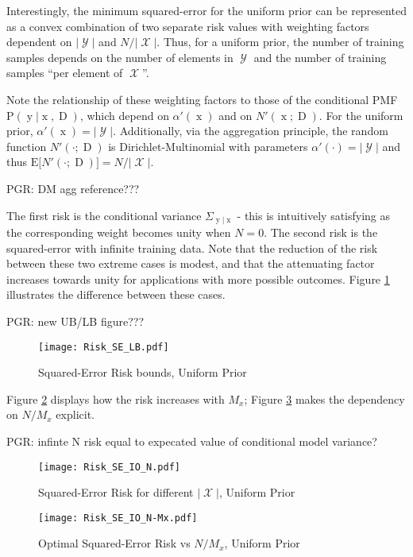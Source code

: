 \documentclass[12pt]{report}
\DeclareMathOperator{\xrm}{\mathrm{x}}
\DeclareMathOperator{\yrm}{\mathrm{y}}
\DeclareMathOperator{\Drm}{\mathrm{D}}
\DeclareMathOperator{\Xcal}{\mathcal{X}}
\DeclareMathOperator{\Ycal}{\mathcal{Y}}
\begin{document}
Interestingly, the minimum squared-error for the uniform prior can be represented as a convex combination of two separate risk values with weighting factors dependent on $|\Ycal|$ and $N/|\Xcal|$. Thus, for a uniform prior, the number of training samples depends  on the number of elements in $\Ycal$ and the number of training samples ``per element of $\Xcal$''.

Note the relationship of these weighting factors to those of the conditional PMF $\text{P}(\yrm | \xrm,\Drm)$, which depend on $\alpha'(\xrm)$ and on $N'(\xrm;\Drm)$. For the uniform prior, $\alpha'(\xrm) = |\Ycal|$. Additionally, via the aggregation principle, the random function $N'(\cdot;\Drm)$ is Dirichlet-Multinomial with parameters $\alpha'(\cdot) = |\Ycal|$ and thus $\text{E}\big[ N'(\cdot;\Drm) \big] = N/|\Xcal|$.

PGR: DM agg reference???

The first risk is the conditional variance $\Sigma_{\yrm|\xrm}$ - this is intuitively satisfying as the corresponding weight becomes unity when $N=0$. The second risk is the squared-error with infinite training data. Note that the reduction of the risk between these two extreme cases is modest, and that the attenuating factor increases towards unity for applications with more possible outcomes. Figure \ref{fig:Risk_SE_LB} illustrates the difference between these cases.

PGR: new UB/LB figure???

\begin{figure}
\centering
\texttt{[image: Risk\_SE\_LB.pdf]}
\caption{Squared-Error Risk bounds, Uniform Prior}
\label{fig:Risk_SE_LB}
\end{figure}

Figure \ref{fig:Risk_SE_IO_N} displays how the risk increases with $M_x$; Figure \ref{fig:Risk_SE_IO_N-Mx} makes the dependency on $N/M_x$ explicit.

PGR: infinte N risk equal to expecated value of conditional model variance?


\begin{figure}
\centering
\texttt{[image: Risk\_SE\_IO\_N.pdf]}
\caption{Squared-Error Risk for different $|\Xcal|$, Uniform Prior}
\label{fig:Risk_SE_IO_N}
\end{figure}

\begin{figure}
\centering
\texttt{[image: Risk\_SE\_IO\_N-Mx.pdf]}
\caption{Optimal Squared-Error Risk vs $N/M_x$, Uniform Prior}
\label{fig:Risk_SE_IO_N-Mx}
\end{figure}
\end{document}
